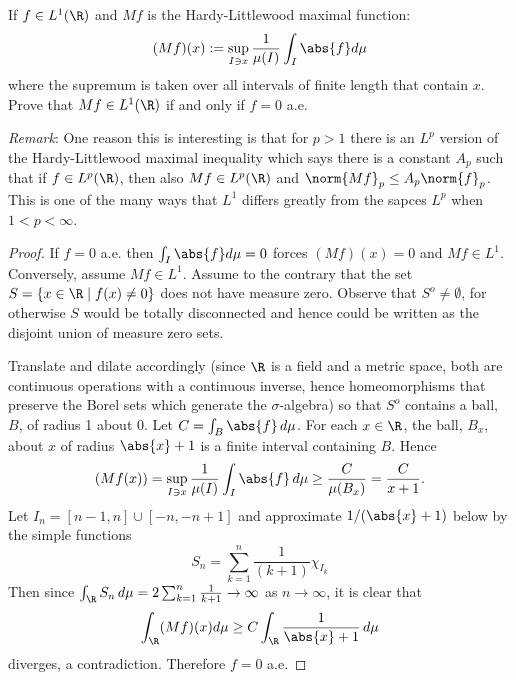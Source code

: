 \documentclass[12pt]{amsart}
\begin{document}
\newpage

\begin{thm}\label{ex8}
  If $f \in L^1(\R)$ and $Mf$ is the Hardy-Littlewood maximal function:
  $$(Mf)(x) := \sup_{I \ni x} \frac{1}{\mu(I)} \int_I \abs{f} d \mu$$
  where the supremum is taken over all intervals of finite length that contain $x$.
  Prove that $Mf \in L^1(\R)$ if and only if $f = 0$ a.e.

  {\it Remark}: One reason this is interesting is that for $p > 1$ there is an $L^p$ version of the Hardy-Littlewood maximal inequality which says there is a constant $A_p$ such that if $f \in L^p(\R)$, then also $Mf \in L^p(\R)$ and $\norm{Mf}_p \leq A_p \norm{f}_p$.
  This is one of the many ways that $L^1$ differs greatly from the sapces $L^p$ when $1 < p < \infty$.
  
  \begin{proof}
    If $f = 0$ a.e. then $\int_I \abs{f} d\mu = 0$ forces $(Mf)(x) = 0$ and $Mf \in L^1$.
    Conversely, assume $Mf \in L^1$.
    Assume to the contrary that the set $S = \{x \in \R \mid f(x) \neq 0\}$ does not have measure zero.
    Observe that $S^o \neq \emptyset$, for otherwise $S$ would be totally disconnected and hence could be written as the disjoint union of measure zero sets.
    
    Translate and dilate accordingly (since $\R$ is a field and a metric space, both are continuous operations with a continuous inverse, hence homeomorphisms that preserve the Borel sets which generate the $\sigma$-algebra) so that $S^o$ contains a ball, $B$, of radius 1 about 0.
    Let $C = \int_B \abs{f}\, d\mu$.
    For each $x \in \R$, the ball, $B_x$, about $x$ of radius $\abs{x} + 1$ is a finite interval containing $B$.
    Hence 
    $$(Mf(x)) = \sup_{I \ni x} \frac{1}{\mu(I)} \int_I \abs{f}\, d\mu \geq \frac{C}{\mu(B_x)} = \frac{C}{x + 1}.$$
    Let $I_n = [n-1, n] \cup [-n, -n + 1]$ and approximate $1/(\abs{x} + 1)$ below by the simple functions
    $$S_n = \sum_{k = 1}^n \frac{1}{(k+1)}\chi_{I_k}$$
    Then since $\int_\R S_n\, d\mu = 2\sum_{k = 1}^n \frac{1}{k + 1} \rightarrow \infty$ as $n \rightarrow \infty$, it is clear that
    $$\int_\R (Mf)(x) d\mu \geq C \int_\R \frac{1}{\abs{x} + 1}\, d\mu$$
    diverges, a contradiction.
    Therefore $f = 0$ a.e.
  \end{proof}
\end{thm}
\end{document}
